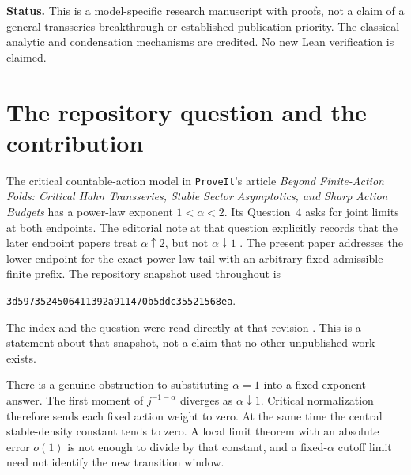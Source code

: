 \documentclass[11pt,a4paper]{article}
\theoremstyle{definition}\newtheorem{definition}[theorem]{Definition}
\theoremstyle{remark}\newtheorem{remark}[theorem]{Remark}
\newcommand{\eps}{\varepsilon}
\newcommand{\E}{\mathbb E}
\newcommand{\1}{\mathbf 1}
\newcommand{\repo}{\texttt{ProveIt}}
\begin{document}
\begin{titlepage}
\begin{abstract}
For the associated Poisson action process, conditioned on total weight
$n$, deleting the largest action leaves the unconditioned independent
Poisson process in total variation, for every joint limit
$n\to\infty$, $\eps\downarrow0$. When $n\eps\to\infty$, the largest
action satisfies
\[
 \frac{J-B}{\eps B}+\log\eps\ \Longrightarrow\ -Z,
 \qquad
 \E e^{itZ}=\exp\{-\tfrac\pi2|t|-it\log|t|\}.
\]
This gives a sharp Landau-distribution cutoff window and its quantiles.
When $n\eps\to\lambda<\infty$, the deficit $n-J$ instead converges in
total variation to a discrete compound-Poisson law. These limits match
as $\lambda\to\infty$. All proofs are conventional; reproducible exact
finite checks and numerical diagnostics accompany the paper.
\end{abstract}
\vfill
\noindent\textbf{Status.} This is a model-specific research manuscript with
proofs, not a claim of a general transseries breakthrough or established
publication priority. The classical analytic and condensation mechanisms
are credited. No new Lean verification is claimed.
\end{titlepage}
\hypersetup{pageanchor=true}
\tableofcontents
\clearpage

\section{The repository question and the contribution}
\label{sec:introduction}

The critical countable-action model in \repo's article
\emph{Beyond Finite-Action Folds: Critical Hahn Transseries, Stable Sector
Asymptotics, and Sharp Action Budgets} has a power-law exponent
$1<\alpha<2$. Its Question~4 asks for joint limits at both endpoints.
The editorial note at that question explicitly records that the later
endpoint papers treat $\alpha\uparrow2$, but not $\alpha\downarrow1$
\cite{repo-critical}. The present paper addresses the lower endpoint for
the exact power-law tail with an arbitrary fixed admissible finite
prefix. The repository snapshot used throughout is
\begin{center}\small\texttt{3d5973524506411392a911470b5ddc35521568ea}.\end{center}
The index and the question were read directly at that revision
\cite{repo-index,repo-critical}. This is a statement about that snapshot,
not a claim that no other unpublished work exists.

There is a genuine obstruction to substituting $\alpha=1$ into a
fixed-exponent answer. The first moment of $j^{-1-\alpha}$ diverges as
$\alpha\downarrow1$. Critical normalization therefore sends each fixed
action weight to zero. At the same time the central stable-density
constant tends to zero. A local limit theorem with an absolute error
$o(1)$ is not enough to divide by that constant, and a fixed-$\alpha$
cutoff limit need not identify the new transition window.
\end{document}
